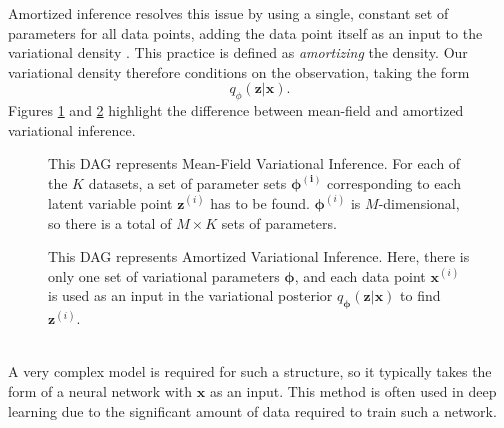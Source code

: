 \documentclass[honours,12pt, twoside]{unswthesis}
\numberwithin{equation}{section}
\theoremstyle{definition}
\begin{document}
Amortized inference resolves this issue by using a single, constant set of parameters for all data points, adding the data point itself as an input to the variational density \citep{ADVVI}. This practice is defined as \textit{amortizing} the density. Our variational density therefore conditions on the observation, taking the form
\[q_\phi(\bm{z}|\bm{x}).\]
Figures \ref{fig:3.1} and \ref{fig:3.2} highlight the difference between mean-field and amortized variational inference.\\
\begin{figure}[h]
  \centering
   \caption{\small This DAG represents Mean-Field Variational Inference. For each of the $K$ datasets, a set of parameter sets $\bm{\phi^{(i)}}$ corresponding to each latent variable point $\bm{z}^{(i)}$ has to be found. $\bm{\phi}^{(i)}$ is $M$-dimensional, so there is a total of $M\times K$ sets of parameters.}
   \label{fig:3.1}
\end{figure}
\begin{figure}[h]
\centering
  \caption{\small This DAG represents Amortized Variational Inference. Here, there is only one set of variational parameters $\bm{\phi}$, and each data point $\bm{x}^{(i)}$ is used as an input in the variational posterior $q_{\bm{\phi}}(\bm{z}|\bm{x})$ to find $\bm{z}^{(i)}$.}
  \label{fig:3.2}
\end{figure}\\
A very complex model is required for such a structure, so it typically takes the form of a neural network with $\bm{x}$ as an input. This method is often used in deep learning due to the significant amount of data required to train such a network.
\end{document}
